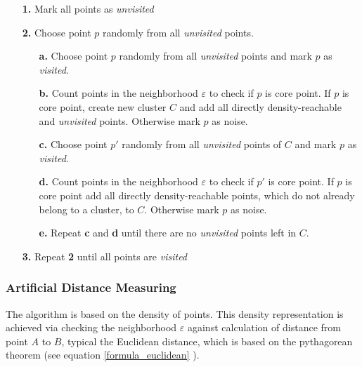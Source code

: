 \begin{itemize}
	\item[\textbf{1.}] Mark all points as \textit{unvisited}
	\item[\textbf{2.}] Choose point $p$ randomly from all \textit{unvisited} points.
	\begin{itemize}
		\item[\textbf{a.}] Choose point $p$ randomly from all \textit{unvisited} points and mark $p$ as \textit{visited}.
		\item[\textbf{b.}] Count points in the neighborhood $\varepsilon$ to check if $p$ is core point. If $p$ is core point, create new cluster $C$ and add all directly density-reachable and \textit{unvisited} points. Otherwise mark $p$ as noise.
		\item[\textbf{c.}] Choose point $p'$ randomly from all \textit{unvisited} points of $C$ and mark $p$ as \textit{visited}.
		\item[\textbf{d.}] Count points in the neighborhood $\varepsilon$ to check if $p'$ is core point. If $p$ is core point add all directly density-reachable points, which do not already belong to a cluster, to $C$. Otherwise mark $p$ as noise.
		\item[\textbf{e.}] Repeat \textbf{c} and \textbf{d} until there are no \textit{unvisited} points left in $C$.	
	\end{itemize} 
	\item[\textbf{3.}] Repeat \textbf{2} until all points are \textit{visited} 
\end{itemize}


\subsubsection{Artificial Distance Measuring}
The algorithm is based on the density of points. This density representation is achieved via checking the neighborhood $\varepsilon$ against calculation of distance from point $A$ to $B$, typical the Euclidean distance, which is based on the pythagorean theorem (see equation \ref{formula_euclidean} \parencite{Erhard2020}).

